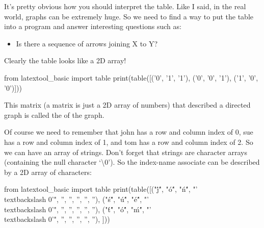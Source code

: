 It's pretty obvious how you should interpret the table. Like I said, in the real world, graphs can be extremely huge. So we need to find a way to put the table into a program and answer interesting questions such as:

\begin{itemize}
\item
  Is there a sequence of arrows joining X to Y?
\end{itemize}

Clearly the table looks like a 2D array!
\begin{python}
from latextool_basic import table
print(table([('0', '1', '1'), ('0', '0', '1'), ('1', '0', '0')]))
\end{python}

This matrix (a matrix is just a 2D array of numbers) that described a directed graph is called the  of the graph.

Of course we need to remember that john has a row and column index of 0, sue has a row and column index of 1, and tom has a row and column index of 2. So we can have an array of strings. Don't forget that strings are character arrays (containing the null character `\textbackslash 0'). So the index-name associate can be described by a 2D array of characters:

\begin{python}
from latextool_basic import table
print(table([("\'j\'", "\'o\'", "\'n\'", "'\\textbackslash 0'", '', '', '', '', ''),
("\'s\'", "\'u\'", "\'e\'", "'\\textbackslash 0'", '', '', '', '', ''),
("\'t\'", "\'o\'", "\'m\'", "'\\textbackslash 0'", '', '', '', '', ''),
]))
\end{python}

